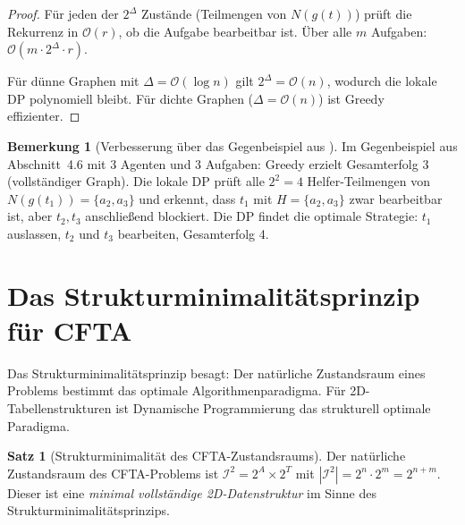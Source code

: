 ﻿\documentclass[a4paper,12pt]{article}
\theoremstyle{definition}
\newtheorem{satz}{Satz}
\newtheorem{bemerkung}{Bemerkung}
\begin{document}
\begin{proof}
    F\"{u}r jeden der $2^{\Delta}$ Zust\"{a}nde (Teilmengen von $N(g(t))$)
    pr\"{u}ft die Rekurrenz in $\mathcal{O}(r)$, ob die Aufgabe bearbeitbar ist.
    \"{U}ber alle $m$ Aufgaben: $\mathcal{O}(m \cdot 2^\Delta \cdot r)$.

    F\"{u}r d\"{u}nne Graphen mit $\Delta = \mathcal{O}(\log n)$ gilt
    $2^\Delta = \mathcal{O}(n)$, wodurch die lokale DP polynomiell bleibt.
    F\"{u}r dichte Graphen ($\Delta = \mathcal{O}(n)$) ist Greedy effizienter. \qedhere
\end{proof}

\begin{bemerkung}[Verbesserung \"{u}ber das Gegenbeispiel aus \cite{dwzk07}]
    Im Gegenbeispiel aus Abschnitt~4.6 mit 3 Agenten und 3 Aufgaben:
    Greedy erzielt Gesamterfolg 3 (vollst\"{a}ndiger Graph).
    Die lokale DP pr\"{u}ft alle $2^2 = 4$ Helfer-Teilmengen von
    $N(g(t_1)) = \{a_2, a_3\}$ und erkennt, dass $t_1$ mit
    $H = \{a_2, a_3\}$ zwar bearbeitbar ist, aber $t_2, t_3$ anschlie{\ss}end
    blockiert. Die DP findet die optimale Strategie: $t_1$ auslassen,
    $t_2$ und $t_3$ bearbeiten, Gesamterfolg 4.
\end{bemerkung}

\section{Das Strukturminimalit\"{a}tsprinzip f\"{u}r CFTA}

Das Strukturminimalit\"{a}tsprinzip \cite{epp2026struktur} besagt:
Der nat\"{u}rliche Zustandsraum eines Problems bestimmt das optimale
Algorithmenparadigma. F\"{u}r 2D-Tabellenstrukturen ist Dynamische
Programmierung das strukturell optimale Paradigma.

\begin{satz}[Strukturminimalit\"{a}t des CFTA-Zustandsraums]
    \label{satz:struct_cfta}
    Der nat\"{u}rliche Zustandsraum des CFTA-Problems ist
    $\mathcal{I}^2 = 2^A \times 2^T$ mit $|\mathcal{I}^2| = 2^n \cdot 2^m = 2^{n+m}$.
    Dieser ist eine \emph{minimal vollst\"{a}ndige 2D-Datenstruktur} im Sinne
    des Strukturminimalit\"{a}tsprinzips.
\end{satz}
\end{document}
